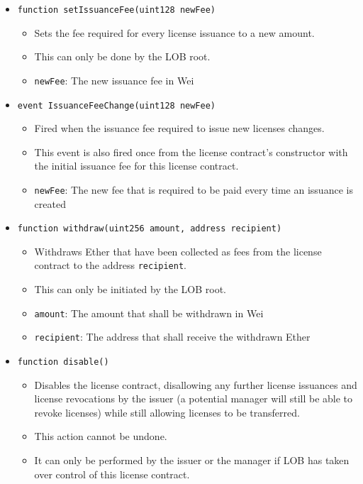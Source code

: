 \documentclass[a4paper]{article}
\begin{document}
\begin{itemize}
  \item \texttt{function setIssuanceFee(uint128 newFee)}
  \begin{itemize}
    \item Sets the fee required for every license issuance to a new amount. 
    \item This can only be done by the LOB root.
    \item \texttt{newFee}: The new issuance fee in Wei
  \end{itemize}
  
  \item \texttt{event IssuanceFeeChange(uint128 newFee)}
  \begin{itemize}
    \item Fired when the issuance fee required to issue new licenses changes. 
    \item This event is also fired once from the license contract's constructor with the initial issuance fee for this license contract.
    \item \texttt{newFee}: The new fee that is required to be paid every time an issuance is created
  \end{itemize}
  
  \item \texttt{function withdraw(uint256 amount, address recipient)}
  \begin{itemize}
    \item Withdraws Ether that have been collected as fees from the license contract to the address \texttt{recipient}. 
    \item This can only be initiated by the LOB root.
    \item \texttt{amount}: The amount that shall be withdrawn in Wei
    \item \texttt{recipient}: The address that shall receive the withdrawn Ether
  \end{itemize}
  
  \item \texttt{function disable()}
  \begin{itemize}
    \item Disables the license contract, disallowing any further license issuances and license revocations by the issuer (a potential manager will still be able to revoke licenses) while still allowing licenses to be transferred. 
    \item This action cannot be undone. 
    \item It can only be performed by the issuer or the manager if LOB has taken over control of this license contract.
  \end{itemize}
  

\end{itemize}
\end{document}
